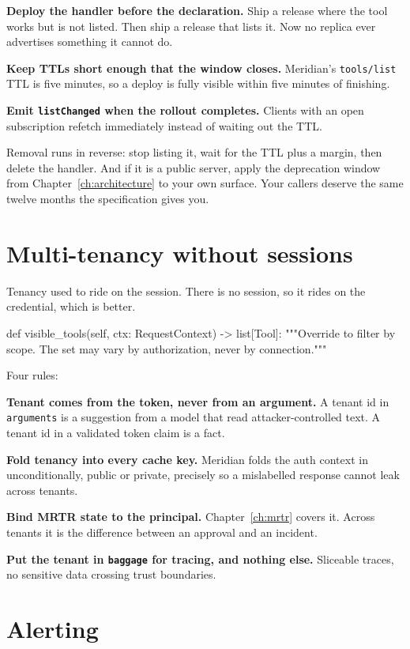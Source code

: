 \textbf{Deploy the handler before the declaration.} Ship a release where the tool
works but is not listed. Then ship a release that lists it. Now no replica ever
advertises something it cannot do.

\textbf{Keep TTLs short enough that the window closes.} Meridian's
\texttt{tools/list} TTL is five minutes, so a deploy is fully visible within five
minutes of finishing.

\textbf{Emit \texttt{listChanged} when the rollout completes.} Clients with an
open subscription refetch immediately instead of waiting out the TTL.

Removal runs in reverse: stop listing it, wait for the TTL plus a margin, then
delete the handler. And if it is a public server, apply the deprecation window
from Chapter~\ref{ch:architecture} to your own surface. Your callers deserve the
same twelve months the specification gives you.

\section{Multi-tenancy without sessions}

Tenancy used to ride on the session. There is no session, so it rides on the
credential, which is better.

\begin{py}
def visible_tools(self, ctx: RequestContext) -> list[Tool]:
    """Override to filter by scope. The set may vary by authorization,
    never by connection."""
\end{py}

Four rules:

\textbf{Tenant comes from the token, never from an argument.} A tenant id in
\texttt{arguments} is a suggestion from a model that read attacker-controlled
text. A tenant id in a validated token claim is a fact.

\textbf{Fold tenancy into every cache key.} Meridian folds the auth context in
unconditionally, public or private, precisely so a mislabelled response cannot
leak across tenants.

\textbf{Bind MRTR state to the principal.} Chapter~\ref{ch:mrtr} covers it. Across
tenants it is the difference between an approval and an incident.

\textbf{Put the tenant in \texttt{baggage} for tracing, and nothing else.}
Sliceable traces, no sensitive data crossing trust boundaries.

\section{Alerting}

